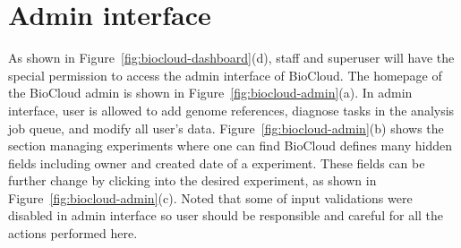 \section{Admin interface}
\label{s:biocloud-admin}



As shown in Figure~\ref{fig:biocloud-dashboard}(d), staff and superuser will
have the special permission to access the admin interface of BioCloud. The
homepage of the BioCloud admin is shown in Figure~\ref{fig:biocloud-admin}(a).
In admin interface, user is allowed to add genome references, diagnose tasks in
the analysis job queue, and modify all user's data.
Figure~\ref{fig:biocloud-admin}(b) shows the section managing experiments where
one can find BioCloud defines many hidden fields including owner and created
date of a experiment. These fields can be further change by clicking into the
desired experiment, as shown in Figure~\ref{fig:biocloud-admin}(c). Noted that
some of input validations were disabled in admin interface so user should be
responsible and careful for all the actions performed here.

